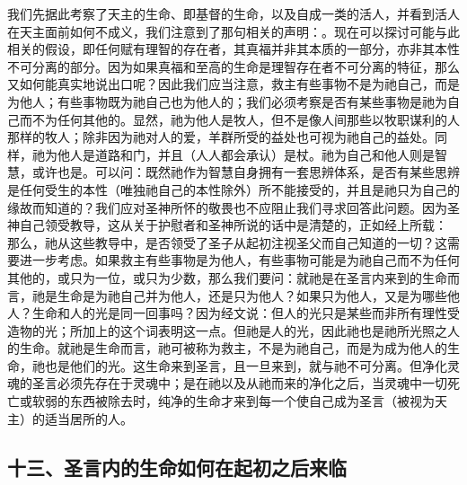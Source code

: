 我们先据此考察了天主的生命、即基督的生命，以及自成一类的活人，并看到活人在天主面前如何不成义，我们注意到了那句相关的声明：。现在可以探讨可能与此相关的假设，即任何赋有理智的存在者，其真福并非其本质的一部分，亦非其本性不可分离的部分。因为如果真福和至高的生命是理智存在者不可分离的特征，那么又如何能真实地说出口呢？因此我们应当注意，救主有些事物不是为祂自己，而是为他人；有些事物既为祂自己也为他人的；我们必须考察是否有某些事物是祂为自己而不为任何其他的。显然，祂为他人是牧人，但不是像人间那些以牧职谋利的人那样的牧人；除非因为祂对人的爱，羊群所受的益处也可视为祂自己的益处。同样，祂为他人是道路和门，并且（人人都会承认）是杖。祂为自己和他人则是智慧，或许也是。可以问：既然祂作为智慧自身拥有一套思辨体系，是否有某些思辨是任何受生的本性（唯独祂自己的本性除外）所不能接受的，并且是祂只为自己的缘故而知道的？我们应对圣神所怀的敬畏也不应阻止我们寻求回答此问题。因为圣神自己领受教导，这从关于护慰者和圣神所说的话中是清楚的，正如经上所载： 那么，祂从这些教导中，是否领受了圣子从起初注视圣父而自己知道的一切？这需要进一步考虑。如果救主有些事物是为他人，有些事物可能是为祂自己而不为任何其他的，或只为一位，或只为少数，那么我们要问：就祂是在圣言内来到的生命而言，祂是生命是为祂自己并为他人，还是只为他人？如果只为他人，又是为哪些他人？生命和人的光是同一回事吗？因为经文说：但人的光只是某些而非所有理性受造物的光；所加上的这个词表明这一点。但祂是人的光，因此祂也是祂所光照之人的生命。就祂是生命而言，祂可被称为救主，不是为祂自己，而是为成为他人的生命，祂也是他们的光。这生命来到圣言，且一旦来到，就与祂不可分离。但净化灵魂的圣言必须先存在于灵魂中；是在祂以及从祂而来的净化之后，当灵魂中一切死亡或软弱的东西被除去时，纯净的生命才来到每一个使自己成为圣言（被视为天主）的适当居所的人。\par


\subsection{十三、圣言内的生命如何在起初之后来临}

